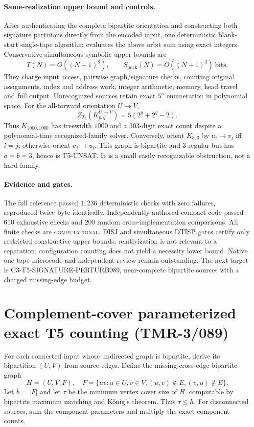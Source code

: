 \documentclass[11pt]{article}
\begin{document}
\paragraph{Same-realization upper bound and controls.}
After authenticating the complete bipartite orientation and constructing both signature partitions directly from the encoded input, one deterministic blank-start single-tape algorithm evaluates the above orbit sum using exact integers. Conservative simultaneous symbolic upper bounds are
\[
T(N)=O((N+1)^8),\qquad S_{\mathrm{peak}}(N)=O((N+1)^3)\ \mathrm{bits}.
\]
They charge input access, pairwise graph/signature checks, counting original assignments, index and address work, integer arithmetic, memory, head travel and full output. Unrecognized sources retain exact $5^n$ enumeration in polynomial space. For the all-forward orientation $U\to V$,
\[
Z_{T_5}(K_{p,q}^{U\to V})=5(2^p+2^q-2).
\]
Thus $K_{1000,1000}$ has treewidth $1000$ and a $303$-digit exact count despite a polynomial-time recognized-family solver. Conversely, orient $K_{3,3}$ by $u_i\to v_j$ iff $i=j$; otherwise orient $v_j\to u_i$. This graph is bipartite and 3-regular but has $a=b=3$, hence is T5-UNSAT. It is a small easily recognizable obstruction, not a hard family.

\paragraph{Evidence and gates.} The full reference passed $1{,}236$ deterministic checks with zero failures, reproduced twice byte-identically. Independently authored compact code passed $610$ exhaustive checks and $200$ random cross-implementation comparisons. All finite checks are \textsc{computational}. DISJ and simultaneous DTISP gates certify only restricted constructive upper bounds; relativization is not relevant to a separation; configuration counting does not yield a necessity lower bound. Native one-tape microcode and independent review remain outstanding. The next target is \textsf{C3-T5-SIGNATURE-PERTURB089}, near-complete bipartite sources with a charged missing-edge budget.


\section{Complement-cover parameterized exact T5 counting (TMR-3/089)}
\label{sec:tmr3-089}
For each connected input whose undirected graph is bipartite, derive
its bipartition $(U,V)$ from source edges. Define the missing-cross-edge
bipartite graph
\[
H=(U,V,F),\quad
F=\{uv:u\in U,v\in V,(u,v)\notin E,(v,u)\notin E\}.
\]
Let $h=|F|$ and let $\tau$ be the minimum vertex cover size of $H$,
computable by bipartite maximum matching and K\H{o}nig's theorem.
Thus $\tau\le h$. For disconnected sources, sum the component
parameters and multiply the exact component counts.
\end{document}
